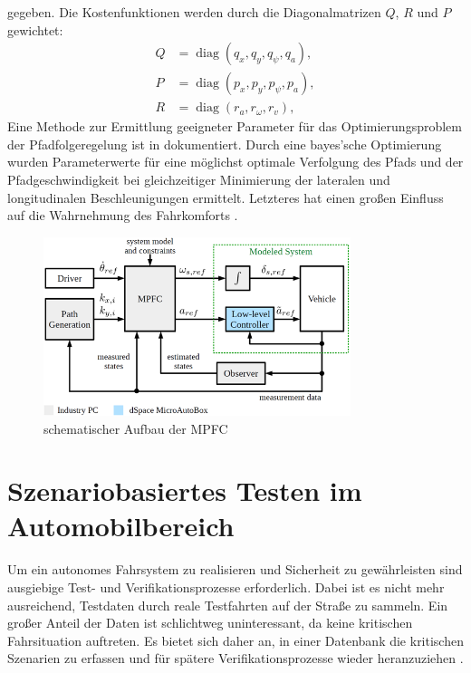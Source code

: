 \noindent gegeben. Die Kostenfunktionen werden durch die Diagonalmatrizen $Q$, $R$ und $P$ gewichtet:
\begin{equation}
    \begin{split}
        Q &= \operatorname{diag}(q_x, q_y, q_\psi, q_a), \\
        P &= \operatorname{diag}(p_x, p_y, p_\psi, p_a), \\
        R &= \operatorname{diag}(r_a, r_\omega, r_v),
    \end{split}
\end{equation}
\noindent Eine Methode zur Ermittlung geeigneter Parameter für das Optimierungsproblem der Pfadfolgeregelung ist in \cite{math11020465} dokumentiert. Durch eine bayes'sche Optimierung wurden Parameterwerte für eine möglichst optimale Verfolgung des Pfads und der Pfadgeschwindigkeit bei gleichzeitiger Minimierung der lateralen und longitudinalen Beschleunigungen ermittelt. Letzteres hat einen großen Einfluss auf die Wahrnehmung des Fahrkomforts \cite{BELLEM201890}.
\begin{figure}[H]
    \centering
    \includegraphics[width=0.8\textwidth]{figures/2_Grundlagen/MPFC_Schema.png}
    \caption{schematischer Aufbau der MPFC \cite{ritschel2019}}
    \label{fig:MPFC_Schema}
\end{figure}
    
\section{Szenariobasiertes Testen im Automobilbereich} \label{sec:SoftwaretestsAutomobil}

Um ein autonomes Fahrsystem zu realisieren und Sicherheit zu gewährleisten sind ausgiebige Test- und Verifikationsprozesse erforderlich. Dabei ist es nicht mehr ausreichend, Testdaten durch reale Testfahrten auf der Straße zu sammeln. Ein großer Anteil der Daten ist schlichtweg uninteressant, da keine kritischen Fahrsituation auftreten. Es bietet sich daher an, in einer Datenbank die kritischen Szenarien zu erfassen und für spätere Verifikationsprozesse wieder heranzuziehen \cite{Nalic2020}.

